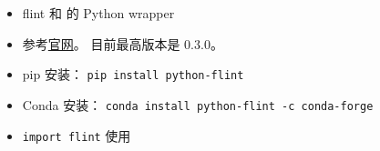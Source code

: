 
\begin{issues}
\issueDraft
\end{issues}

\begin{itemize}
\item flint 和  的 Python wrapper
\item 参考\href{https://fredrikj.net/python-flint/}{官网}。 目前最高版本是 0.3.0。
\item pip 安装： \verb|pip install python-flint|
\item Conda 安装： \verb|conda install python-flint -c conda-forge|
\item \verb|import flint| 使用
\end{itemize}
